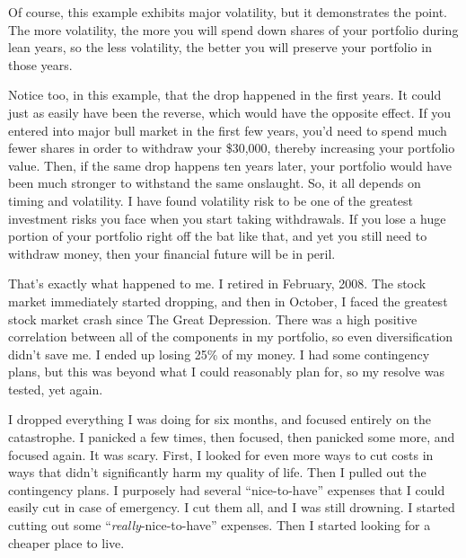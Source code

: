 \begin{figure}[htbp]
  \centering
\end{figure}

Of course, this example exhibits major volatility, but it demonstrates the point. The more volatility, the more you will spend down shares of your portfolio during lean years, so the less volatility, the better you will preserve your portfolio in those years.

Notice too, in this example, that the drop happened in the first years. It could just as easily have been the reverse, which would have the opposite effect. If you entered into major bull market in the first few years, you'd need to spend much fewer shares in order to withdraw your \$30,000, thereby increasing your portfolio value. Then, if the same drop happens ten years later, your portfolio would have been much stronger to withstand the same onslaught. So, it all depends on timing and volatility. I have found volatility risk to be one of the greatest investment risks you face when you start taking withdrawals. If you lose a huge portion of your portfolio right off the bat like that, and yet you still need to withdraw money, then your financial future will be in peril.

That's exactly what happened to me. I retired in February, 2008. The stock market immediately started dropping, and then in October, I faced the greatest stock market crash since The Great Depression. There was a high positive correlation between all of the components in my portfolio, so even diversification didn't save me. I ended up losing 25\% of my money. I had some contingency plans, but this was beyond what I could reasonably plan for, so my resolve was tested, yet again.

I dropped everything I was doing for six months, and focused entirely on the catastrophe. I panicked a few times, then focused, then panicked some more, and focused again. It was scary. First, I looked for even more ways to cut costs in ways that didn't significantly harm my quality of life. Then I pulled out the contingency plans. I purposely had several ``nice-to-have'' expenses that I could easily cut in case of emergency. I cut them all, and I was still drowning. I started cutting out some ``\emph{really}-nice-to-have'' expenses. Then I started looking for a cheaper place to live.

